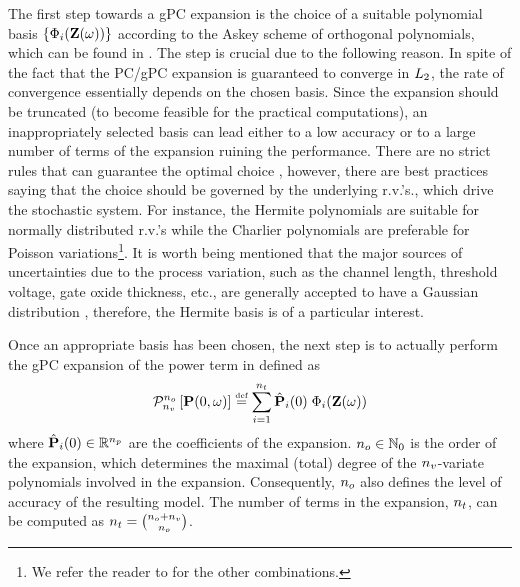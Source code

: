 The first step towards a gPC expansion is the choice of a suitable polynomial basis $\{ \Phi_i(\mathbf{Z}(\omega)) \}$ according to the Askey scheme of orthogonal polynomials, which can be found in \cite{xiu2002}. The step is crucial due to the following reason. In spite of the fact that the PC/gPC expansion is guaranteed to converge in $L_{2}$, the rate of convergence essentially depends on the chosen basis. Since the expansion should be truncated (to become feasible for the practical computations), an inappropriately selected basis can lead either to a low accuracy or to a large number of terms of the expansion ruining the performance. There are no strict rules that can guarantee the optimal choice \cite{knio2006}, however, there are best practices saying that the choice should be governed by the underlying r.v.'s., which drive the stochastic system. For instance, the Hermite polynomials are suitable for normally distributed r.v.'s while the Charlier polynomials are preferable for Poisson variations\footnote{We refer the reader to \cite{xiu2002} for the other combinations.}. It is worth being mentioned that the major sources of uncertainties due to the process variation, such as the channel length, threshold voltage, gate oxide thickness, etc., are generally accepted to have a Gaussian distribution \cite{srivastava2010, liu2007, juan2012}, therefore, the Hermite basis is of a particular interest.

Once an appropriate basis has been chosen, the next step is to actually perform the gPC expansion of the power term in  defined as
\begin{equation} \elabel{pc-expansion}
  \oPC{\vars}{\pcorder}{\vP(0, \o)} \eqdef \sum_{i = 1}^{\pcterms} \pcc{\vP}_i(0) \; \pcb_i(\vZ(\o))
\end{equation}
where $\hat{\mathbf{P}}_i(0) \in \mathbb{R}^{n_p}$ are the coefficients of the expansion. ${n_o} \in \mathbb{N}_{0}$ is the order of the expansion, which determines the maximal (total) degree of the ${n_v}$-variate polynomials involved in the expansion. Consequently, ${n_o}$ also defines the level of accuracy of the resulting model. The number of terms in the expansion, ${n_t}$, can be computed as ${n_t} = {{n_o} + {n_v} \choose {n_o}}$.

